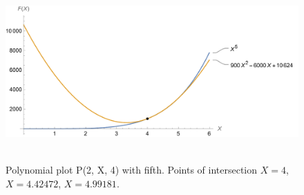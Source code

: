 ﻿\begin{figure}[H]
    \centering
    \includegraphics[width=1\textwidth]{sections/images/03_plots_polynomial_p2_n4_with_fifth}
    ~\caption{Polynomial plot P(2, X, 4) with fifth.
    Points of intersection $X=4$, $X=4.42472$, $X=4.99181$.}\label{fig:figure9}
\end{figure}
